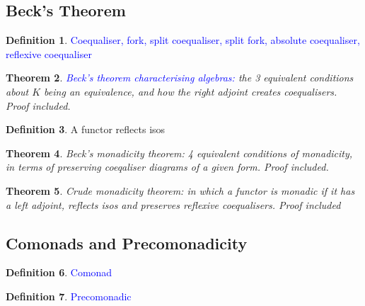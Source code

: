 \documentclass{tufte-handout} %
\theoremstyle{theorem}
\newtheorem{thm}{Theorem}[subsection]
\theoremstyle{definition}
\newtheorem{defn}[thm]{Definition}
\theoremstyle{remark}
\theoremstyle{remark}
\begin{document}
\subsection{Beck's Theorem}

		\begin{defn}
			\textcolor{blue}{Coequaliser, fork, split coequaliser, split fork, absolute coequaliser, reflexive coequaliser}
		\end{defn}	
		\begin{thm}
			\textcolor{blue}{Beck's theorem characterising algebras:} the 3 equivalent conditions about $ K $ being an equivalence, and how the right adjoint creates coequalisers. \textit{Proof included.}
		\end{thm}
		\begin{defn}
			A functor reflects isos
		\end{defn}
		\begin{thm}
			Beck's monadicity theorem: 4 equivalent conditions of monadicity, in terms of preserving coeqaliser diagrams of a given form. \textit{Proof included.}
		\end{thm}
	    \begin{thm}
			Crude monadicity theorem: in which a functor is monadic if it has a left adjoint, reflects isos and preserves reflexive coequalisers. \textit{Proof included}
		\end{thm}

\subsection{Comonads and Precomonadicity}
	    \begin{defn}
			\textcolor{blue}{Comonad}
		\end{defn}
		\begin{defn}
			\textcolor{blue}{Precomonadic}
		\end{defn}
\end{document}
